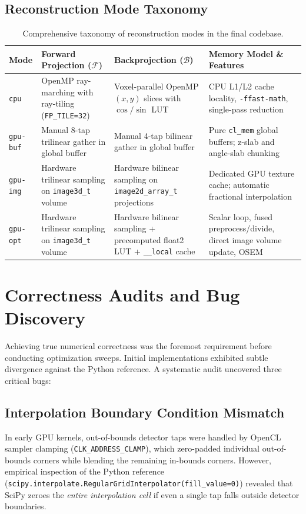 \documentclass[11pt,a4paper]{article}
\begin{document}
\subsection{Reconstruction Mode Taxonomy}
\begin{table}[h!]
\centering
\small
\begin{tabularx}{\textwidth}{l L L L}
\toprule
\textbf{Mode} & \textbf{Forward Projection ($\mathcal{F}$)} & \textbf{Backprojection ($\mathcal{B}$)} & \textbf{Memory Model \& Features} \\
\midrule
\texttt{cpu} & OpenMP ray-marching with ray-tiling (\texttt{FP\_TILE=32}) & Voxel-parallel OpenMP $(x,y)$ slices with $\cos/\sin$ LUT & CPU L1/L2 cache locality, \texttt{-ffast-math}, single-pass reduction \\
\midrule
\texttt{gpu-buf} & Manual 8-tap trilinear gather in global buffer & Manual 4-tap bilinear gather in global buffer & Pure \texttt{cl\_mem} global buffers; z-slab and angle-slab chunking \\
\midrule
\texttt{gpu-img} & Hardware trilinear sampling on \texttt{image3d\_t} volume & Hardware bilinear sampling on \texttt{image2d\_array\_t} projections & Dedicated GPU texture cache; automatic fractional interpolation \\
\midrule
\texttt{gpu-opt} & Hardware trilinear sampling on \texttt{image3d\_t} volume & Hardware bilinear sampling + precomputed float2 LUT + \texttt{\_\_local} cache & Scalar loop, fused preprocess/divide, direct image volume update, OSEM \\
\bottomrule
\end{tabularx}
\caption{Comprehensive taxonomy of reconstruction modes in the final codebase.}
\label{tab:mode_taxonomy}
\end{table}

\section{Correctness Audits and Bug Discovery}
\label{sec:correctness}

Achieving true numerical correctness was the foremost requirement before conducting optimization sweeps. Initial implementations exhibited subtle divergence against the Python reference. A systematic audit uncovered three critical bugs:

\subsection{Interpolation Boundary Condition Mismatch}
In early GPU kernels, out-of-bounds detector taps were handled by OpenCL sampler clamping (\texttt{CLK\_ADDRESS\_CLAMP}), which zero-padded individual out-of-bounds corners while blending the remaining in-bounds corners. However, empirical inspection of the Python reference (\texttt{scipy.interpolate.RegularGridInterpolator(fill\_value=0)}) revealed that SciPy zeroes the \emph{entire interpolation cell} if even a single tap falls outside detector boundaries.
\end{document}
